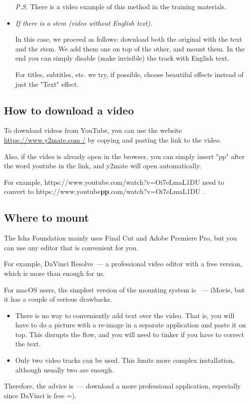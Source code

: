 \documentclass[
a4paper, %
12pt, %
article,
onecolumn, %
openany, %
]{memoir}
\begin{document}
\begin{itemize}
\begin{itemize}
\end{itemize}
\textit{P.S.} There is a video example of this method in the training materials.

\item \emph{If there is a stem (video without English text).}

In this case, we proceed as follows: download both the original with the text
and the stem. We add them one on top of the other, and mount them. In the end
you can simply disable (make invisible) the track
with English text.

For titles, subtitles, etc. we try, if possible,
choose beautiful effects instead of just the "Text" effect.
\end{itemize}

\subsection{How to download a video}
To download videos from YouTube, you can use the website
\href{https://www.y2mate.com /}{https://www.y2mate.com /} by copying and pasting
the link to the video.

Also, if the video is already open in the browser, you can simply insert "pp" after
the word youtube in the link, and y2mate will open automatically.

For example, https://www.youtube.com/watch?v=Oi7eLmaL1DU need to convert
to https://www.youtube\textbf {pp}.com/watch?v=Oi7eLmaL1DU .

\subsection{Where to mount}
The Isha Foundation mainly uses Final Cut and Adobe Premiere Pro,
but you can use any editor that is convenient for you.

For example, DaVinci Resolve~---
a professional video editor with a free version, which is more than enough for us.

For macOS users, the simplest version of the mounting system is ~---
iMovie, but it has a couple of serious drawbacks.
\begin{itemize}
\item There is no way to conveniently add text over the video.
That is, you will have to do
a picture with a re-image in a separate application and paste it on top.
This disrupts the flow, and you will need to tinker if you have to correct the text.
\item Only two video tracks can be used. This limits more
complex installation, although usually two are enough.
\end{itemize}
Therefore, the advice is~--- download a more professional application, especially since
DaVinci is free =).
\end{document}
